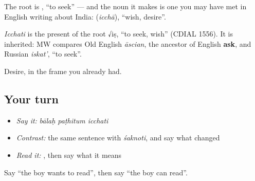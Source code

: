 The root is \textbf{}, \textquotedblleft{}to seek\textquotedblright{} — and the noun it makes is one you may have met in English writing about India: \textbf{} (\emph{icchā}), \textquotedblleft{}wish, desire\textquotedblright{}.

\begin{cousinweb}
\emph{Icchati} is the present of the root √iṣ, \textquotedblleft{}to seek, wish\textquotedblright{} (CDIAL 1556). It is inherited: MW compares Old English \emph{āscian}, the ancestor of English \textbf{ask}, and Russian \emph{iskat'}, \textquotedblleft{}to seek\textquotedblright{}.
\end{cousinweb}

\begin{grammarlens}[title={What you've built}]
Desire, in the frame you already had.
\end{grammarlens}

\subsection*{Your turn}
\begin{itemize}
\raggedright
  \item \emph{Say it:} \emph{bālaḥ paṭhitum icchati}
  \item \emph{Contrast:} the same sentence with \emph{śaknoti}, and say what changed
  \item \emph{Read it:} \textbf{}, then say what it means
\end{itemize}

\begin{tcolorbox}[breakable,colback=teal!4,colframe=teal!35!black,title={Before you move on}]
Say \textquotedblleft{}the boy wants to read\textquotedblright{}, then say \textquotedblleft{}the boy can read\textquotedblright{}.
\end{tcolorbox}
